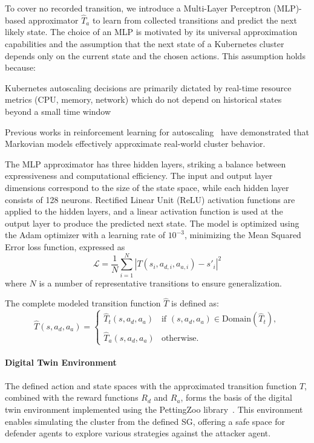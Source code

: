 To cover no recorded transition, we introduce a Multi-Layer Perceptron (MLP)-based approximator $\hat{T}_a$ to learn from collected transitions and predict the next likely state. The choice of an MLP is motivated by its universal approximation capabilities and the assumption that the next state of a Kubernetes cluster depends only on the current state and the chosen actions. This assumption holds because:
\begin{enumerate*}[label={\roman*)}, itemjoin={;\quad }]
  \item Kubernetes autoscaling decisions are primarily dictated by real-time resource metrics (CPU, memory, network) which do not depend on historical states beyond a small time window
  \item Previous works in reinforcement learning for autoscaling~\cite{Gari2021} have demonstrated that Markovian models effectively approximate real-world cluster behavior.
\end{enumerate*}
The MLP approximator has three hidden layers, striking a balance between expressiveness and computational efficiency. The input and output layer dimensions correspond to the size of the state space, while each hidden layer consists of 128 neurons. Rectified Linear Unit (ReLU) activation functions are applied to the hidden layers, and a linear activation function is used at the output layer to produce the predicted next state. The model is optimized using the Adam optimizer with a learning rate of $10^{-3}$, minimizing the Mean Squared Error loss function, expressed as
$$
  \mathcal{L} = \frac{1}{N} \sum_{i=1}^N |T(s_i, a_{d,i}, a_{a,i}) - s'_i|^2
$$
where $N$ is a number of representative transitions to ensure generalization.

The complete modeled transition function $\hat{T}$ is defined as:
$$
  \hat{T}(s, a_d, a_a) =
  \begin{cases}
    \hat{T}_t(s, a_d, a_a) & \text{if } (s, a_d, a_a) \in \text{Domain}(\hat{T}_t), \\
    \hat{T}_a(s, a_d, a_a) & \text{otherwise}.
  \end{cases}
$$

\noindent \paragraph{\textbf{Digital Twin Environment}} The defined action and state spaces with the approximated transition function $\hat{T}$, combined with the reward functions $R_d$ and $R_a$, forms the basis of the digital twin environment implemented using the PettingZoo library~\cite{terry2020pettingzoo}. This environment enables simulating the cluster from the defined SG, offering a safe space for defender agents to explore various strategies against the attacker agent.



